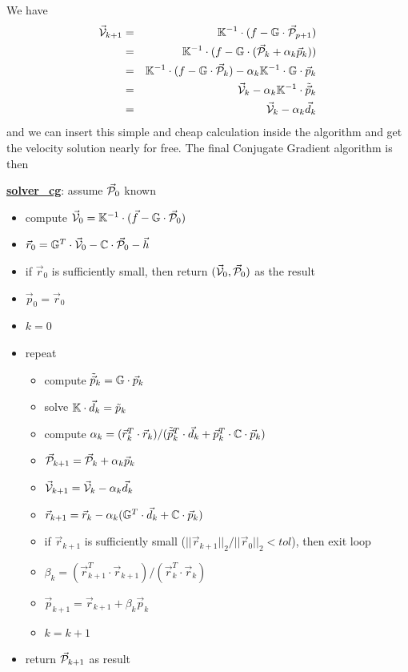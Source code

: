 We have 
\begin{eqnarray}
\vec{\cal V}_{k+1} 
&=& {\mathbb{K}}^{-1}\cdot (f - {\mathbb{G}}\cdot \vec{\cal P}_{p+1} ) \nonumber\\
&=& {\mathbb{K}}^{-1}\cdot (f - {\mathbb{G}}\cdot (\vec{\cal P}_k+\alpha_k \vec{p}_k) ) \nonumber\\
&=& {\mathbb{K}}^{-1}\cdot (f - {\mathbb{G}}\cdot \vec{\cal P}_k) - \alpha_k {\mathbb{K}}^{-1}\cdot {\mathbb{G}} \cdot \vec{p}_k \nonumber\\
&=& \vec{\cal V}_k - \alpha_k {\mathbb{K}}^{-1}\cdot \tilde{\vec{p}}_k  \nonumber\\
&=& \vec{\cal V}_k - \alpha_k \vec{d}_k 
\end{eqnarray}
and we can insert this simple and cheap calculation inside the algorithm and get the velocity solution 
nearly for free. The final Conjugate Gradient algorithm is then 

\newpage
\begin{mdframed}[backgroundcolor=blue!5]
\underline{\bf solver\_cg}: assume $\vec{\cal P}_0$ known
\begin{itemize}
\item compute $\vec{\cal V}_0={\mathbb{K}}^{-1}\cdot (\vec{f}-{\mathbb{G}} \cdot \vec{\cal P}_0)$
\item $\vec{r}_0 = {\mathbb{G}}^T\cdot \vec{\cal V}_0 -{\mathbb{C}} \cdot \vec{\cal P}_0 - \vec{h}$ 
\item if $\vec{r}_0$ is sufficiently small, then return $(\vec{\cal V}_0,\vec{\cal P}_0)$ as the result
\item $\vec{p}_0=\vec{r}_0$
\item $k=0$
\item repeat
\begin{itemize}
\item compute $\tilde{\vec{p}}_k = {\mathbb{G}} \cdot \vec{p}_k$
\item solve ${\mathbb{K}}\cdot \vec{d}_k = \tilde{p}_k$
\item compute $\alpha_k=(\vec{r}_k^T \cdot  \vec{r}_k)/(\tilde{\vec{p}}_k^T \cdot \vec{d}_k 
      + \vec{p}_k^T \cdot {\mathbb{C}}\cdot \vec{p}_k)$
\item $\vec{\cal P}_{k+1} = \vec{\cal P}_k+\alpha_k \vec{p}_k$
\item $ \vec{\cal V}_{k+1} = \vec{\cal V}_k - \alpha_k \vec{d}_k$
\item $\vec{r}_{k+1} = \vec{r}_k - \alpha_k ({\mathbb{G}}^T \cdot \vec{d}_k + {\mathbb{C}} \cdot \vec{p}_k) $
\item if $\vec{r}_{k+1}$ is sufficiently small ($||\vec{r}_{k+1}||_2/||\vec{r}_0||_2 <tol$), then exit loop
\item $\beta_k=(\vec{r}_{k+1}^T \cdot \vec{r}_{k+1})/(\vec{r}_k^T \cdot \vec{r}_k)$
\item $\vec{p}_{k+1} =\vec{r}_{k+1}+ \beta_k \vec{p}_k$
\item $k=k+1$
\end{itemize}
\item return $\vec{\cal P}_{k+1}$ as result
\end{itemize}
\end{mdframed}

